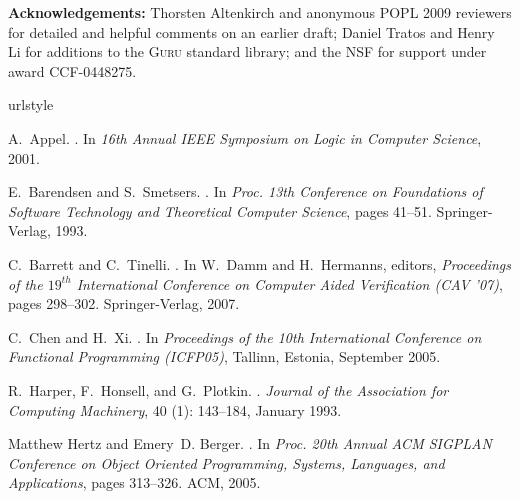 \documentclass[9pt,natbib]{sigplanconf}
\begin{document}
\textbf{Acknowledgements:} Thorsten Altenkirch and anonymous POPL 2009
reviewers for detailed and helpful comments on an earlier draft;
Daniel Tratos and Henry Li for additions to the \textsc{Guru} standard
library; and the NSF for support under award CCF-0448275.

%

%

\begin{thebibliography}{28}
\providecommand{\natexlab}[1]{#1}
\providecommand{\url}[1]{\texttt{#1}}
\expandafter\ifx\csname urlstyle\endcsname\relax
  \providecommand{\doi}[1]{doi: #1}\else
  \providecommand{\doi}{doi: \begingroup \urlstyle{rm}\Url}\fi

A.~Appel.
.
\newblock In \emph{16th Annual IEEE Symposium on Logic in Computer Science},
  2001.

E.~Barendsen and S.~Smetsers.
.
\newblock In \emph{Proc. 13th Conference on Foundations of Software Technology
  and Theoretical Computer Science}, pages 41--51. Springer-Verlag, 1993.

C.~Barrett and C.~Tinelli.
.
\newblock In W.~Damm and H.~Hermanns, editors, \emph{Proceedings of the
  $19^{th}$ International Conference on Computer Aided Verification (CAV '07)},
  pages 298--302. Springer-Verlag, 2007.

C.~Chen and H.~Xi.
.
\newblock In \emph{Proceedings of the 10th International Conference on
  Functional Programming (ICFP05)}, Tallinn, Estonia, September 2005.

R.~Harper, F.~Honsell, and G.~Plotkin.
.
\newblock \emph{Journal of the Association for Computing Machinery},
  40 (1): 143--184, January 1993.

Matthew Hertz and Emery~D. Berger.
.
\newblock In \emph{Proc. 20th Annual ACM SIGPLAN Conference on Object Oriented
  Programming, Systems, Languages, and Applications}, pages 313--326. ACM,
  2005.


\end{thebibliography}
\end{document}
